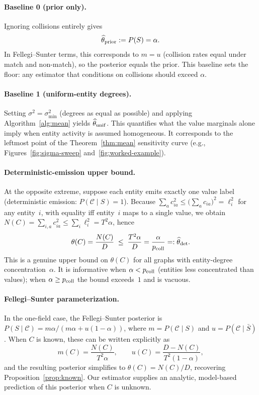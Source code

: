 \documentclass[11pt]{article}
\newcommand{\1}{\mathbf{1}}
\newcommand{\coll}{\mathcal{C}} %
\theoremstyle{plain}
\theoremstyle{definition}
\begin{document}
\paragraph{Baseline 0 (prior only).}
Ignoring collisions entirely gives
\[
\widehat\theta_{\rm prior} := P(S) = \alpha.
\]
In Fellegi--Sunter terms, this corresponds to $m = u$ (collision rates equal under match and non-match), so the posterior equals the prior.
This baseline sets the floor: any estimator that conditions on collisions should exceed $\alpha$.

\paragraph{Baseline 1 (uniform-entity degrees).}
Setting $\sigma^2 = \sigma^2_{\min}$ (degrees as equal as possible) and applying Algorithm~\ref{alg:mean} yields
$\widehat\theta_{\rm unif}$.
This quantifies what the value marginals alone imply when entity activity is assumed homogeneous.
It corresponds to the leftmost point of the Theorem~\ref{thm:mean} sensitivity curve (e.g., Figures~\ref{fig:sigma-sweep} and~\ref{fig:worked-example}).

\paragraph{Deterministic-emission upper bound.}
At the opposite extreme, suppose each entity emits exactly one value label (deterministic emission: $P(\coll\mid S)=1$).
Because $\sum_a c_{ia}^2 \le \bigl(\sum_a c_{ia}\bigr)^2 = \ell_i^2$ for any entity~$i$,
with equality iff entity~$i$ maps to a single value, we obtain
$N(C) = \sum_{i,a} c_{ia}^2 \le \sum_i \ell_i^2 = T^2\alpha$, hence
\[
\theta(C) = \frac{N(C)}{D} \;\le\; \frac{T^2\alpha}{D} = \frac{\alpha}{p_{\rm coll}}
=: \widehat\theta_{\rm det}.
\]
This is a genuine upper bound on $\theta(C)$ for all graphs with entity-degree concentration~$\alpha$.
It is informative when $\alpha < p_{\rm coll}$ (entities less concentrated than values); when $\alpha \ge p_{\rm coll}$ the bound exceeds~$1$ and is vacuous.

\paragraph{Fellegi--Sunter parameterization.}
In the one-field case, the Fellegi--Sunter posterior is
$P(S\mid \coll)=m\alpha/(m\alpha + u(1-\alpha))$,
where $m=P(\coll\mid S)$ and $u=P(\coll\mid \bar S)$.
When $C$ is known, these can be written explicitly as
\[
m(C)=\frac{N(C)}{T^2\alpha}, \qquad
u(C)=\frac{D-N(C)}{T^2(1-\alpha)},
\]
and the resulting posterior simplifies to $\theta(C)=N(C)/D$, recovering Proposition~\ref{prop:known}.
Our estimator supplies an analytic, model-based prediction of this posterior when $C$ is unknown.
\end{document}
